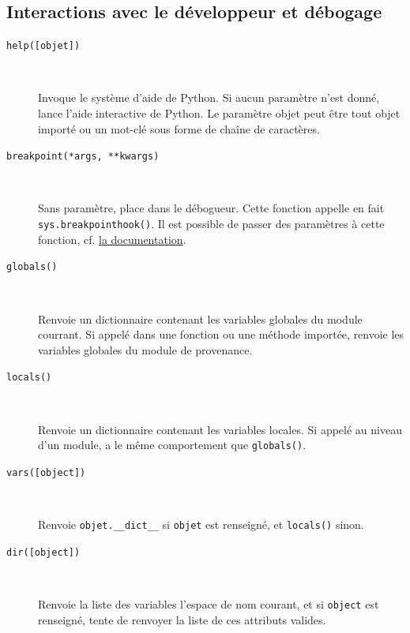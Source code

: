 \documentclass[a4paper, 10pt]{article}
\begin{document}
\subsection{Interactions avec le développeur et débogage}

\begin{description}
    \item[\texttt{help([objet])}]~
    
    Invoque le système d'aide de Python. Si aucun paramètre n'est donné, lance l'aide interactive de Python. Le paramètre objet peut être tout objet importé ou un mot-clé sous forme de chaîne de caractères.

    \item[\texttt{breakpoint(*args, **kwargs)}]~
    
    Sans paramètre, place dans le débogueur. Cette fonction appelle en fait \texttt{sys.breakpointhook()}. Il est possible de passer des paramètres à cette fonction, cf. \href{https://docs.python.org/fr/3/library/sys.html\#sys.breakpointhook}{la documentation}.

    \item[\texttt{globals()}]~
    
    Renvoie un dictionnaire contenant les variables globales du module courrant. Si appelé dans une fonction ou une méthode importée, renvoie les variables globales du module de provenance.
    
    \item[\texttt{locals()}]~
    
    Renvoie un dictionnaire contenant les variables locales. Si appelé au niveau d'un module, a le même comportement que \texttt{globals()}.

    \item[\texttt{vars([object])}]~
    
    Renvoie \texttt{objet.__dict__} si \texttt{objet} est renseigné, et \texttt{locals()} sinon.

    \item[\texttt{dir([object])}]~
    
    Renvoie la liste des variables l'espace de nom courant, et si \texttt{object} est renseigné, tente de renvoyer la liste de ces attributs valides.
    

\end{description}
\end{document}
